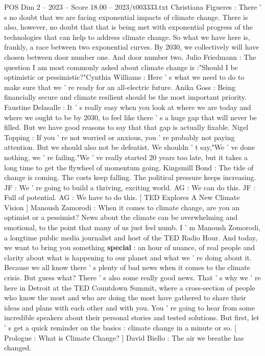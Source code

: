 \begin{textsample}{POS Dim 2 – 2023 – Score 18.00 – 2023/t003333.txt}  \label{ex:f2_pos_049}
Christiana Figueres : There ' s no doubt that we are facing exponential impacts of climate change.
There is also, however, no doubt that that is being met with exponential progress of the technologies that can help to address climate change.
So what we have here is, frankly, a race between two exponential curves.
By 2030, we collectively will have chosen between door number one.
And door number two.
Julio Friedmann : The question I am most commonly asked about climate change is :"Should I be optimistic or pessimistic?"Cynthia Williams : Here ' s what we need to do to make sure that we ' re ready for an all-electric future.
Anika Goss : Being financially secure and climate resilient should be the most important priority.
Faustine Delasalle : It ' s really easy when you look at where we are today and where we ought to be by 2030, to feel like there ' s a huge gap that will never be filled.
But we have good reasons to say that that gap is actually fixable.
Nigel Topping : If you ' re not worried or anxious, you ' re probably not paying attention.
But we should also not be defeatist.
We shouldn ' t say,"We ' ve done nothing, we ' re failing."We ' ve really started 20 years too late, but it takes a long time to get the flywheel of momentum going.
Kingsmill Bond : The tide of change is coming.
The costs keep falling.
The political pressure keeps increasing.
JF : We ' re going to build a thriving, exciting world.
AG : We can do this.
JF : Full of potential.
AG : We have to do this. [ TED Explores A New Climate Vision ] Manoush Zamorodi : When it comes to climate change, are you an optimist or a pessimist?
News about the climate can be overwhelming and emotional, to the point that many of us just feel numb.
I ' m Manoush Zomorodi, a longtime public media journalist and host of the TED Radio Hour.
And today, we want to bring you something \textbf{special} : an hour of nuance, of real people and clarity about what is happening to our planet and what we ' re doing about it.
Because we all know there ' s plenty of bad news when it comes to the climate crisis.
But guess what?
There ' s also some really good news.
That ' s why we ' re here in Detroit at the TED Countdown Summit, where a cross-section of people who know the most and who are doing the most have gathered to share their ideas and plans with each other and with you.
You ' re going to hear from some incredible speakers about their personal stories and tested solutions.
But first, let ' s get a quick reminder on the basics : climate change in a minute or so. [ Prologue : What is Climate Change? ] David Biello : The air we breathe has changed.

\end{textsample}
